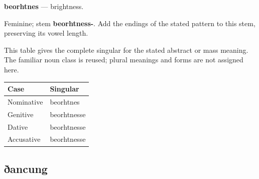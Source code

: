 \par\begin{minipage}{\linewidth}\raggedright
\textbf{beorhtnes} — brightness.

Feminine; stem \textbf{beorhtness-}. Add the endings of the stated pattern to this stem, preserving its vowel length.

This table gives the complete singular for the stated abstract or mass meaning. The familiar noun class is reused; plural meanings and forms are not assigned here.

\par\begingroup
\fontsize{10.5}{13.2}\selectfont
\setlength{\LTleft}{0pt}\setlength{\LTright}{\fill}
\noindent
\begin{tabular}{@{}>{\raggedright\arraybackslash}p{57.71mm}>{\raggedright\arraybackslash}p{63.48mm}@{}}
\toprule
\textbf{Case} & \textbf{Singular} \\
\midrule
Nominative & beorhtnes \\
Genitive & beorhtnesse \\
Dative & beorhtnesse \\
Accusative & beorhtnesse \\
\bottomrule
\end{tabular}
\par\endgroup

\end{minipage}\par
{}
\subsection*{ðancung}

